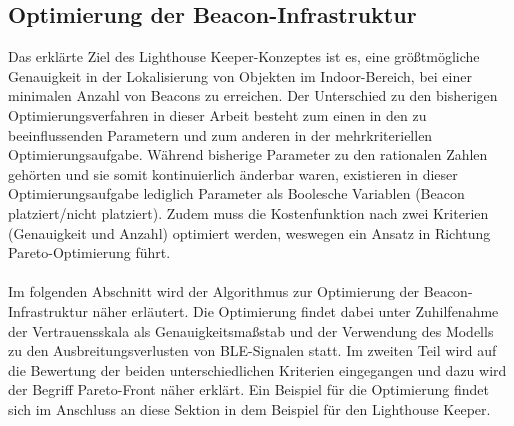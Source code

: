 \subsection{Optimierung der Beacon-Infrastruktur}
Das erklärte Ziel des Lighthouse Keeper-Konzeptes ist es, eine größtmögliche Genauigkeit in der Lokalisierung von Objekten im Indoor-Bereich, bei einer minimalen Anzahl von Beacons zu erreichen. Der Unterschied zu den bisherigen Optimierungsverfahren in dieser Arbeit besteht zum einen in den zu beeinflussenden Parametern und zum anderen in der mehrkriteriellen Optimierungsaufgabe. Während bisherige Parameter zu den rationalen Zahlen gehörten und sie somit kontinuierlich änderbar waren, existieren in dieser Optimierungsaufgabe lediglich Parameter als Boolesche Variablen (Beacon platziert/nicht platziert). Zudem muss die Kostenfunktion nach zwei Kriterien (Genauigkeit und Anzahl) optimiert werden, weswegen ein Ansatz in Richtung Pareto-Optimierung führt. \\ \\
Im folgenden Abschnitt wird der Algorithmus zur Optimierung der Beacon-Infrastruktur näher erläutert. Die Optimierung findet dabei unter Zuhilfenahme der Vertrauensskala als Genauigkeitsmaßstab und der Verwendung des Modells zu den Ausbreitungsverlusten von BLE-Signalen statt. Im zweiten Teil wird auf die Bewertung der beiden unterschiedlichen Kriterien eingegangen und dazu wird der Begriff Pareto-Front näher erklärt. Ein Beispiel für die Optimierung findet sich im Anschluss an diese Sektion in dem Beispiel für den Lighthouse Keeper.  
